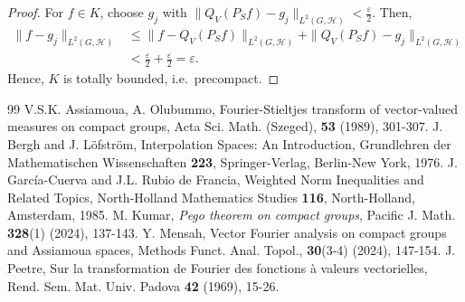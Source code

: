 \documentclass[10pt,a4paper]{amsart}
\begin{document}
\begin{proof}
 For $f\in K$, choose $g_j$ with $\|Q_V(P_Sf)-g_j\|_{L^2(G,\mathcal{H})}
<\frac{\varepsilon}{2}$.  Then, 
\begin{align*}
\|f-g_j\|_{L^2(G,\mathcal{H})}&\le\|f-Q_V(P_Sf)\|_{L^2(G,\mathcal{H})}+
\|Q_V(P_Sf)-g_j\|_{L^2(G,\mathcal{H})}\\
&<\frac{\varepsilon}{2}+\frac{\varepsilon}{2}=\varepsilon.
\end{align*}
 Hence, $K$ is totally bounded, i.e.\ precompact.
\end{proof}


\begin{thebibliography}{99}
 V.S.K. Assiamoua, A. Olubummo, Fourier-Stieltjes transform of vector-valued measures on compact groups, Acta Sci. Math. (Szeged), {\bf 53} (1989), 301-307.
 J. Bergh and J. L\"ofstr\"om, Interpolation Spaces: An Introduction, Grundlehren der Mathematischen Wissenschaften \textbf{223}, Springer-Verlag, Berlin-New York, 1976.
 J. Garc\'ia-Cuerva and J.L. Rubio de Francia, Weighted Norm Inequalities and Related Topics, North-Holland Mathematics Studies \textbf{116}, North-Holland, Amsterdam, 1985.
 M. Kumar, \emph{Pego theorem on compact groups}, Pacific J. Math. \textbf{328}(1) (2024), 137-143.
 Y. Mensah, Vector Fourier analysis on compact groups and Assiamoua spaces, Methods Funct. Anal. Topol., {\bf 30}(3-4) (2024), 147-154.
 J. Peetre, Sur la transformation de Fourier des fonctions \`a valeurs vectorielles, Rend. Sem. Mat. Univ. Padova \textbf{42} (1969), 15-26.
\end{thebibliography}
\end{document}
